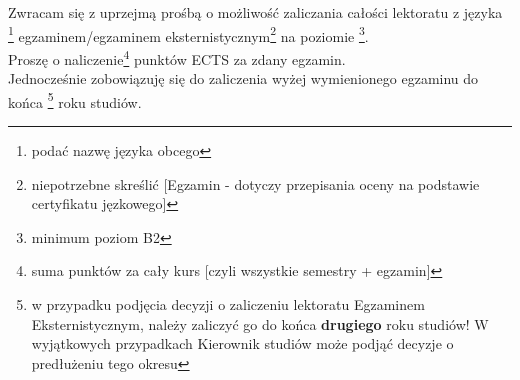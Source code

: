 \documentclass{wmiisubmission}
\begin{document}
\cracowdate
{}
\studentaddress
\addressee{\piotrniemiec}

\vskip 2.0cm

Zwracam się z uprzejmą prośbą o możliwość zaliczania całości
lektoratu z języka
\fillField{3.5cm} \footnote{podać nazwę języka obcego}
egzaminem/egzaminem eksternistycznym\footnote{niepotrzebne skreślić [Egzamin -
dotyczy przepisania oceny na podstawie certyfikatu jęzkowego]}
na poziomie \dotfill\footnote{minimum poziom B2}. \\

Proszę o naliczenie\fillField{3cm}\footnote{suma punktów za cały kurs [czyli
wszystkie semestry + egzamin]} punktów ECTS za zdany egzamin.\\

Jednocześnie zobowiązuję się do zaliczenia wyżej wymienionego egzaminu do końca
\fillField{3cm}\footnote{w przypadku podjęcia decyzji o zaliczeniu lektoratu
Egzaminem Eksternistycznym, należy zaliczyć go do końca \textbf{drugiego} roku
studiów! W wyjątkowych przypadkach Kierownik studiów może podjąć decyzje o
predłużeniu tego okresu} roku studiów.

\vskip 2.0cm

\studentsignature

\vfill
{}
\end{document}

